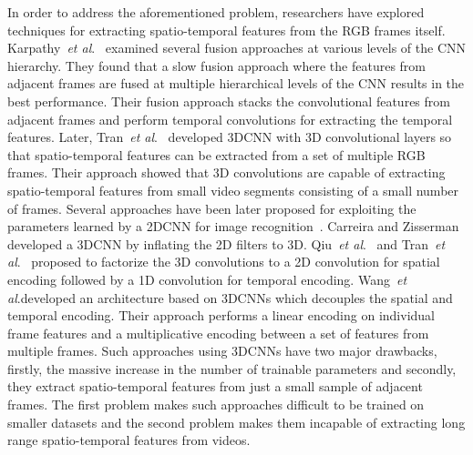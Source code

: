 \documentclass[journal,onecolumn]{IEEEtran}
\def\etal{\emph{et al}.}
\begin{document}
In order to address the aforementioned problem, researchers have explored techniques for extracting spatio-temporal features from the RGB frames itself. Karpathy~\etal~\cite{karpathy2014large} examined several fusion approaches at various levels of the CNN hierarchy. They found that a slow fusion approach where the features from adjacent frames are fused at multiple hierarchical levels of the CNN results in the best performance. Their fusion approach stacks the convolutional features from adjacent frames and perform temporal convolutions for extracting the temporal features. Later, Tran~\etal~\cite{tran2015learning} developed 3DCNN with 3D convolutional layers so that spatio-temporal features can be extracted from a set of multiple RGB frames. Their approach showed that 3D convolutions are capable of extracting spatio-temporal features from small video segments consisting of a small number of frames. Several approaches have been later proposed for exploiting the parameters learned by a 2DCNN for image recognition~\cite{carreira2017quo, qiu2017learning, tran2018closer}. Carreira and Zisserman~\cite{carreira2017quo} developed a 3DCNN by inflating the 2D filters to 3D. Qiu~\etal~\cite{qiu2017learning} and Tran~\etal~\cite{tran2018closer} proposed to factorize the 3D convolutions to a 2D convolution for spatial encoding followed by a 1D convolution for temporal encoding. Wang~\etal developed an architecture based on 3DCNNs which decouples the spatial and temporal encoding. Their approach performs a linear encoding on individual frame features and a multiplicative encoding between a set of features from multiple frames. Such approaches using 3DCNNs have two major drawbacks, firstly, the massive increase in the number of trainable parameters and secondly, they extract spatio-temporal features from just a small sample of adjacent frames. The first problem makes such approaches difficult to be trained on smaller datasets and the second problem makes them incapable of extracting long range spatio-temporal features from videos.
\end{document}

